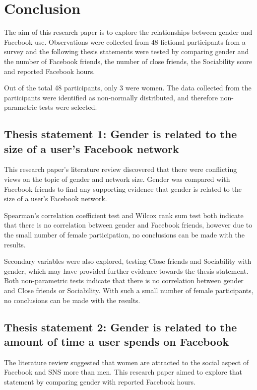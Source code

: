 \section{Conclusion}

The aim of this research paper is to explore the relationships between gender and Facebook use. Observations were collected from 48 fictional participants from a survey and the following thesis statements were tested by comparing gender and the number of Facebook friends, the number of close friends, the Sociability score and reported Facebook hours. 

Out of the total 48 participants, only 3 were women. The data collected from the participants were identified as non-normally distributed, and therefore non-parametric tests were selected. 

\subsection{Thesis statement 1: Gender is related to the size of a user's Facebook network}

This research paper's literature review discovered that there were conflicting views on the topic of gender and network size. Gender was compared with Facebook friends to find any supporting evidence that gender is related to the size of a user's Facebook network.

Spearman's correlation coefficient test and Wilcox rank sum test both indicate that there is no correlation between gender and Facebook friends, however due to the small number of female participation, no conclusions can be made with the results.

Secondary variables were also explored, testing Close friends and Sociability with gender, which may have provided further evidence towards the thesis statement. Both non-parametric tests indicate that there is no correlation between gender and Close friends or Sociability. With such a small number of female participants, no conclusions can be made with the results.

\subsection{Thesis statement 2: Gender is related to the amount of time a user spends on Facebook}

The literature review suggested that women are attracted to the social aspect of Facebook and SNS more than men. This research paper aimed to explore that statement by comparing gender with reported Facebook hours.


